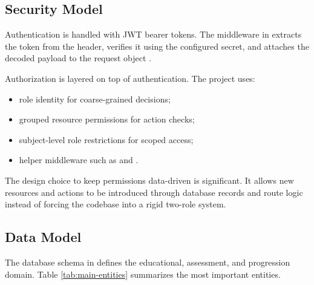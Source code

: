 \subsection{Security Model}

Authentication is handled with JWT bearer tokens. The middleware in  extracts the token from the  header, verifies it using the configured secret, and attaches the decoded payload to the request object \cite{jwt-rfc,jwt-bcp}.

Authorization is layered on top of authentication. The project uses:
\begin{itemize}
  \item role identity for coarse-grained decisions;
  \item grouped resource permissions for action checks;
  \item subject-level role restrictions for scoped access;
  \item helper middleware such as  and .
\end{itemize}

The design choice to keep permissions data-driven is significant. It allows new resources and actions to be introduced through database records and route logic instead of forcing the codebase into a rigid two-role system.

\subsection{Data Model}

The database schema in  defines the educational, assessment, and progression domain. Table \ref{tab:main-entities} summarizes the most important entities.

